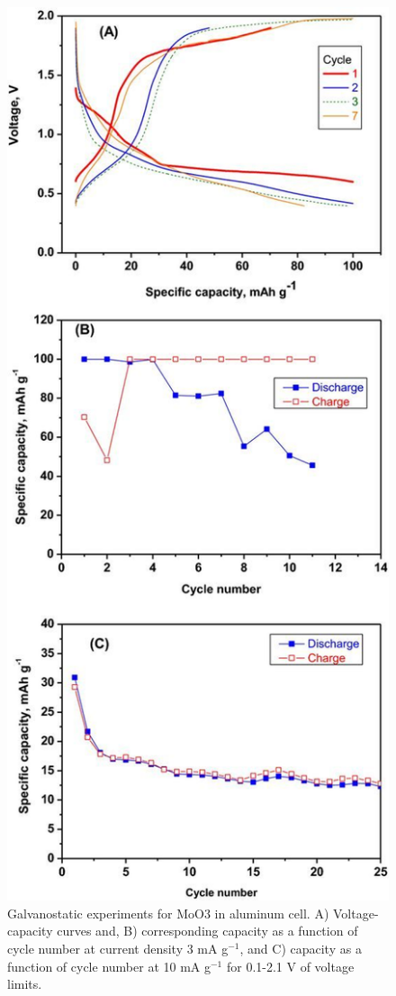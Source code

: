 \begin{figure}[th!]
\centering
\includegraphics[width=\textwidth]{Figures/chap6fig/moo3pap}
\caption{Galvanostatic experiments for MoO3 in aluminum cell. A) Voltage-capacity curves and, B) corresponding capacity as a function of cycle number at current density 3 mA g$^{-1}$, and C) capacity as a function of cycle number at 10 mA g$^{-1}$ for 0.1-2.1 V of voltage limits.}
\label{Figures/chap6fig:moo3pap}
\end{figure}

